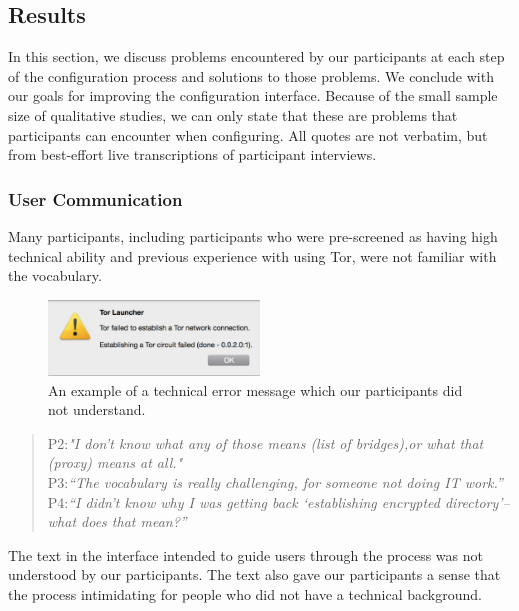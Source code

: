 \documentclass[USenglish,oneside,twocolumn]{article}
\begin{document}
\subsection{Results} 
In this section, we discuss problems encountered by our participants at each step of the configuration process and solutions to those problems. We conclude with our goals for improving the configuration interface. Because of the small sample size of qualitative studies, we can only state that these are problems that participants can encounter when configuring. All quotes are not verbatim, but from best-effort live transcriptions of participant interviews.

\subsubsection{User Communication} 
Many participants, including participants who were pre-screened as having high technical ability and previous experience with using Tor, were not familiar with the vocabulary. 

\begin{figure}[t]
  \centering
    \includegraphics[width=0.5\textwidth]{error.png}
    \caption{An example of a technical error message which our participants did not understand.}
\label{fig:error}
\end{figure}

\begin{quotation}
\noindent P2:\textit{"I don't know what any of those means (list of bridges),or what that (proxy)
 means at all."}\\
 
 \noindent P3:\textit{``The vocabulary is really challenging, for someone not doing IT work.''}\\
 
 \noindent P4:\textit{``I didn't know why I was getting back `establishing encrypted directory'--what does that mean?''}\\
\end{quotation} 
The text in the interface intended to guide users through the process was not understood by our participants. The text also gave our participants a sense that the process intimidating for people who did not have a technical background. 
\end{document}
